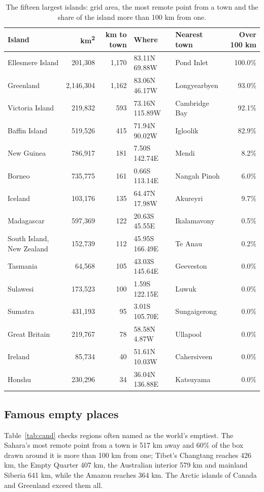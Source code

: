 \documentclass[11pt,a4paper]{article}
\begin{document}
\begin{table}[tbp]\centering\small\caption{The fifteen largest islands: grid area, the most remote point from a town and the share of the island more than 100 km from one.}\label{tab:isl}\begin{tabular}{lrrllr}\toprule Island & km\textsuperscript{2} & km to town & Where & Nearest town & Over 100 km\\\midrule
Ellesmere Island & 201,308 & 1,170 & 83.11N 69.88W & Pond Inlet & 100.0\%\\
Greenland & 2,146,304 & 1,162 & 83.06N 46.17W & Longyearbyen & 93.0\%\\
Victoria Island & 219,832 & 593 & 73.16N 115.89W & Cambridge Bay & 92.1\%\\
Baffin Island & 519,526 & 415 & 71.94N 90.02W & Igloolik & 82.9\%\\
New Guinea & 786,917 & 181 & 7.50S 142.74E & Mendi & 8.2\%\\
Borneo & 735,775 & 161 & 0.66S 113.14E & Nangah Pinoh & 6.0\%\\
Iceland & 103,176 & 135 & 64.47N 17.98W & Akureyri & 9.7\%\\
Madagascar & 597,369 & 122 & 20.63S 45.55E & Ikalamavony & 0.5\%\\
South Island, New Zealand & 152,739 & 112 & 45.95S 166.49E & Te Anau & 0.2\%\\
Tasmania & 64,568 & 105 & 43.03S 145.64E & Geeveston & 0.0\%\\
Sulawesi & 173,523 & 100 & 1.59S 122.15E & Luwuk & 0.0\%\\
Sumatra & 431,193 & 95 & 3.01S 105.70E & Sungaigerong & 0.0\%\\
Great Britain & 219,767 & 78 & 58.58N 4.87W & Ullapool & 0.0\%\\
Ireland & 85,734 & 40 & 51.61N 10.03W & Cahersiveen & 0.0\%\\
Honshu & 230,296 & 34 & 36.04N 136.88E & Katsuyama & 0.0\%\\
\bottomrule\end{tabular}\end{table}

\subsection{Famous empty places}
Table~\ref{tab:cand} checks regions often named as the world's emptiest. The Sahara's most remote point from a town is 517 km away and 60\% of the box drawn around it is more than 100 km from one; Tibet's Changtang reaches 426 km, the Empty Quarter 407 km, the Australian interior 579 km and mainland Siberia 641 km, while the Amazon reaches 364 km. The Arctic islands of Canada and Greenland exceed them all.
\end{document}

